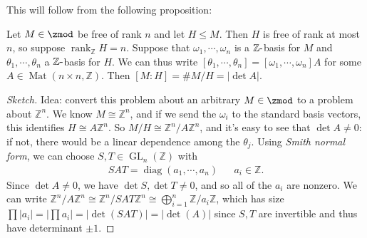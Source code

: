 This will follow from the following proposition:

\begin{proposition}[Index = Determinant]

Let \(M \in \zmod\) be free of rank \(n\) and let \(H \leq M\). Then
\(H\) is free of rank at most \(n\), so suppose
\(\operatorname{rank}_{\mathbb{Z}}H = n\). Suppose that
\(\omega_1, \cdots, \omega_n\) is a \({\mathbb{Z}}{\hbox{-}}\)basis for
\(M\) and \(\theta_1, \cdots, \theta_n\) a
\({\mathbb{Z}}{\hbox{-}}\)basis for \(H\). We can thus write
\({\left[ { \theta_1, \cdots, \theta_n} \right]} = {\left[ { \omega_1, \cdots, \omega_n } \right]} A\)
for some \(A \in \operatorname{Mat}(n\times n, {\mathbb{Z}})\). Then
\([M: H] = \#M/H = {\left\lvert { \det A } \right\rvert}\).

\end{proposition}

\begin{proof}[Sketch]

Idea: convert this problem about an arbitrary \(M \in \zmod\) to a
problem about \({\mathbb{Z}}^n\). We know \(M \cong {\mathbb{Z}}^n\),
and if we send the \(\omega_i\) to the standard basis vectors, this
identifies \(H \cong A {\mathbb{Z}}^n\). So
\(M/H \cong {\mathbb{Z}}^n/A{\mathbb{Z}}^n\), and it's easy to see that
\(\det A \neq 0\): if not, there would be a linear dependence among the
\(\theta_j\). Using \emph{Smith normal form}, we can choose
\(S, T \in \operatorname{GL}_n({\mathbb{Z}})\) with
\begin{align*}
SAT = \operatorname{diag}(a_1, \cdots, a_n) && a_i \in {\mathbb{Z}}
.\end{align*}
Since \(\det A \neq 0\), we have \(\det S, \det T \neq 0\), and so all
of the \(a_i\) are nonzero. We can write
\({\mathbb{Z}}^n/A{\mathbb{Z}}^n \cong {\mathbb{Z}}^n/SAT{\mathbb{Z}}^n \cong \bigoplus_{i=1}^n {\mathbb{Z}}/a_i {\mathbb{Z}}\),
which has size
\(\prod {\left\lvert {a_i} \right\rvert} = {\left\lvert { \prod a_i } \right\rvert} = {\left\lvert { \det (SAT) } \right\rvert} = {\left\lvert { \det(A) } \right\rvert}\)
since \(S, T\) are invertible and thus have determinant \(\pm 1\).

\end{proof}

